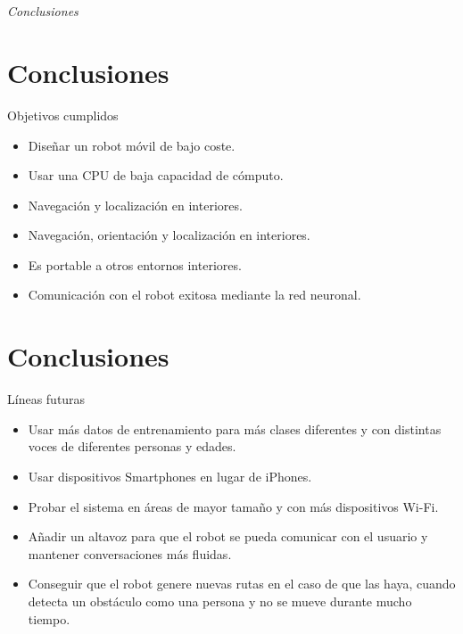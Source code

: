 \documentclass{beamer}
\begin{document}
\section*{}
\begin{frame}{}
  \centering \Huge
  \emph{Conclusiones}
\end{frame}


\section{Conclusiones}
\begin{frame}
\begin{block}{Objetivos cumplidos}
\begin{itemize}
\item Diseñar un robot móvil de bajo coste.
\item Usar una CPU de baja capacidad de cómputo.
\item Navegación y localización en interiores.
\item Navegación, orientación y localización en interiores.
\item Es portable a otros entornos interiores.
\item Comunicación con el robot exitosa mediante la red neuronal.
\end{itemize}
\end{block}

\end{frame}

\section{Conclusiones}
\begin{frame}
\begin{block}{Líneas futuras}
\begin{itemize}
\item Usar más datos de entrenamiento para más clases
diferentes y con distintas voces de diferentes personas y edades.
\item Usar dispositivos Smartphones en lugar de iPhones.
\item Probar el sistema en áreas de mayor tamaño y con más dispositivos Wi-Fi.
\item Añadir un altavoz para que el robot se pueda comunicar con el usuario y
mantener conversaciones más fluidas.
\item Conseguir que el robot genere nuevas rutas en el caso de que las haya, cuando
detecta un obstáculo como una persona y no se mueve durante mucho tiempo.
\end{itemize}
\end{block}
\end{frame}

\begin{frame}[plain]
\large{\titlepage}
\end{frame}
\end{document}
